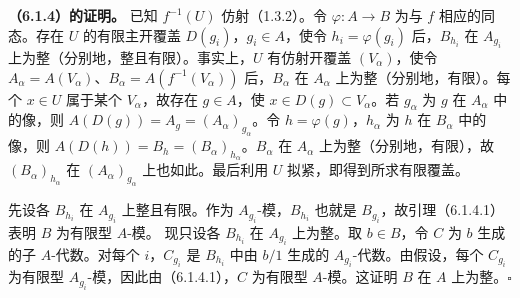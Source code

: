 \noindent\textbf{（6.1.4）的证明。}
已知 $f^{-1}(U)$ 仿射（1.3.2）。令 $\varphi:A\to B$ 为与 $f$ 相应的同态。存在 $U$ 的有限主开覆盖 $D(g_i)$，$g_i\in A$，使令 $h_i=\varphi(g_i)$ 后，$B_{h_i}$ 在 $A_{g_i}$ 上为整（分别地，整且有限）。事实上，$U$ 有仿射开覆盖 $(V_\alpha)$，使令
$A_\alpha=A(V_\alpha)$、$B_\alpha=A(f^{-1}(V_\alpha))$ 后，$B_\alpha$ 在 $A_\alpha$ 上为整（分别地，有限）。每个 $x\in U$ 属于某个 $V_\alpha$，故存在 $g\in A$，使 $x\in D(g)\subset V_\alpha$。若 $g_\alpha$ 为 $g$ 在 $A_\alpha$ 中的像，则
$A(D(g))=A_g=(A_\alpha)_{g_\alpha}$。令 $h=\varphi(g)$，$h_\alpha$ 为 $h$ 在 $B_\alpha$ 中的像，则
$A(D(h))=B_h=(B_\alpha)_{h_\alpha}$。$B_\alpha$ 在 $A_\alpha$ 上为整（分别地，有限），故 $(B_\alpha)_{h_\alpha}$ 在 $(A_\alpha)_{g_\alpha}$ 上也如此。最后利用 $U$ 拟紧，即得到所求有限覆盖。

先设各 $B_{h_i}$ 在 $A_{g_i}$ 上整且有限。作为 $A_{g_i}$-模，$B_{h_i}$ 也就是 $B_{g_i}$，故引理（6.1.4.1）表明 $B$ 为有限型 $A$-模。
现只设各 $B_{h_i}$ 在 $A_{g_i}$ 上为整。取 $b\in B$，令 $C$ 为 $b$ 生成的子 $A$-代数。对每个 $i$，$C_{g_i}$ 是 $B_{h_i}$ 中由 $b/1$ 生成的 $A_{g_i}$-代数。由假设，每个 $C_{g_i}$ 为有限型 $A_{g_i}$-模，因此由（6.1.4.1），$C$ 为有限型 $A$-模。这证明 $B$ 在 $A$ 上为整。\hfill$\square$

